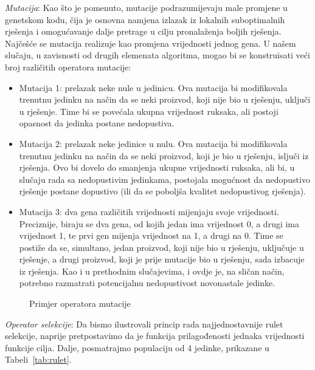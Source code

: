 \documentclass[a4paper, utf8, 11pt, colorlinks]{book}
\begin{document}
\emph{Mutacija}: Kao što je pomenuto, mutacije podrazumijevaju male promjene u genetskom kodu, čija je osnovna namjena izlazak iz lokalnih suboptimalnih rješenja i omogućavanje dalje pretrage u cilju pronalaženja boljih rješenja. Najčešće se mutacija realizuje kao promjena vrijednosti jednog gena. U našem slučaju, u zavisnosti od drugih elemenata algoritma, mogao bi se konstruisati veći broj različitih operatora mutacije: 
\begin{itemize}
	\item Mutacija 1: prelazak neke nule u jedinicu. Ova mutacija bi modifikovala trenutnu jedinku na način da se neki proizvod, koji nije bio u rješenju, uključi u rješenje. Time bi se povećala ukupna vrijednost ruksaka, ali postoji opasnost da jedinka postane nedopustiva.
	\item  Mutacija 2: prelazak neke jedinice u nulu. Ova mutacija bi modifikovala trenutnu jedinku na način da se neki proizvod, koji je bio u rješenju, isljuči iz rješenja. Ovo bi dovelo do smanjenja ukupne vrijednosti ruksaka, ali bi, u slučaju rada sa nedopustivim jedinkama, postojala mogućnost da nedopustivo rješenje postane dopustivo (ili da se poboljša kvalitet nedopustivog rješenja).
	\item  Mutacija 3: dva gena različitih vrijednosti mijenjaju svoje vrijednosti. Preciznije, biraju se dva gena, od kojih jedan ima vrijednost 0, a drugi ima vrijednost 1, te prvi gen mijenja vrijednost na 1, a drugi na 0. Time se postiže da se, simultano, jedan proizvod, koji nije bio u rješenju, uključuje u rješenje, a drugi proizvod, koji je prije mutacije bio u rješenju, sada izbacuje iz rješenja. Kao i u prethodnim slučajevima, i ovdje je, na sličan način, potrebno razmatrati potencijalnu nedopustivost novonastale jedinke.
\end{itemize}





\begin{figure}
	\caption{Primjer operatora mutacije}
\end{figure}

\emph{Operator selekcije}: Da bismo ilustrovali princip rada najjednostavnije rulet selekcije, naprije pretpostavimo da je funkcija prilagođenosti jednaka vrijednosti funkcije cilja. Dalje, posmatrajmo populaciju od 4 jedinke, prikazane u Tabeli~\ref{tab:rulet}.
\end{document}
